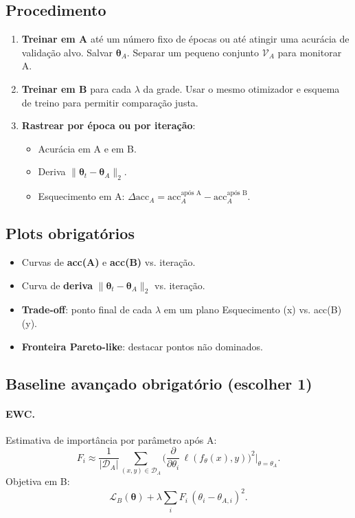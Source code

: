 \documentclass[9pt,a4paper]{extarticle}
\begin{document}
\subsection*{Procedimento}
\begin{enumerate}
  \item \textbf{Treinar em A} até um número fixo de épocas ou até atingir uma acurácia de validação alvo. Salvar $\bm{\theta}_A$. Separar um pequeno conjunto $\mathcal{V}_A$ para monitorar A.
  \item \textbf{Treinar em B} para cada $\lambda$ da grade. Usar o mesmo otimizador e esquema de treino para permitir comparação justa.
  \item \textbf{Rastrear por época ou por iteração}: 
    \begin{itemize}
      \item Acurácia em A e em B.
      \item Deriva $\|\bm{\theta}_t-\bm{\theta}_A\|_2$.
      \item Esquecimento em A: $\Delta\mathrm{acc}_A = \mathrm{acc}_A^{\text{após A}} - \mathrm{acc}_A^{\text{após B}}$.
    \end{itemize}
\end{enumerate}

\subsection*{Plots obrigatórios}
\begin{itemize}
  \item Curvas de \textbf{acc(A)} e \textbf{acc(B)} vs. iteração.
  \item Curva de \textbf{deriva} $\|\bm{\theta}_t-\bm{\theta}_A\|_2$ vs. iteração.
  \item \textbf{Trade-off}: ponto final de cada $\lambda$ em um plano Esquecimento (x) vs. acc(B) (y).
  \item \textbf{Fronteira Pareto-like}: destacar pontos não dominados.
\end{itemize}

\subsection*{Baseline avançado obrigatório (escolher 1)}
\paragraph{EWC.}
Estimativa de importância por parâmetro após A:
\[
F_i \approx \frac{1}{|\mathcal{D}_A|}\sum_{(x,y)\in\mathcal{D}_A}
\Big(\frac{\partial}{\partial \theta_i}\,\ell(f_{\theta}(x),y)\Big)^2\Big|_{\theta=\theta_A}.
\]
Objetiva em B:
\[
\mathcal{L}_B(\bm{\theta}) + \lambda \sum_i F_i\,(\theta_i-\theta_{A,i})^2.
\]
\end{document}
